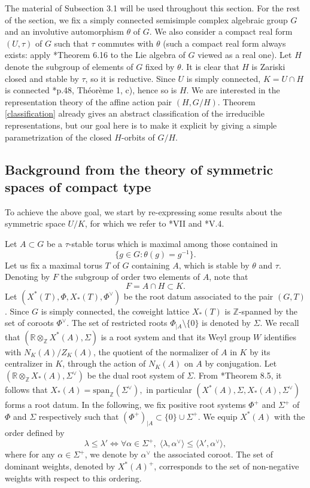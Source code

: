 \documentclass{amsart}
\theoremstyle{definition}
\begin{document}
The material of Subsection 3.1 will be used throughout this section. For the rest of the section, we fix a simply connected semisimple complex algebraic group $G$ and an involutive automorphism $\theta$ of $G$. We also consider a compact real form $(U,\tau)$ of $G$ such that $\tau$ commutes with $\theta$ (such a compact real form always exists: apply \cite{Knapp}*{Theorem 6.16} to the Lie algebra of $G$ viewed as a real one). Let $H$ denote the subgroup of elements of $G$ fixed by $\theta$. It is clear that $H$ is Zariski closed and stable by $\tau$, so it is reductive. Since $U$ is simply connected, $K = U\cap H$ is connected \cite{Bourbaki}*{p.48, Théorème 1, c)}, hence so is $H$. We are interested in the representation theory of the affine action pair $(H, G/H)$. Theorem \ref{classification} already gives an abstract classification of the irreducible representations, but our goal here is to make it explicit by giving a simple parametrization of the closed $H$-orbits of $G/H$.

\subsection{Background from the theory of symmetric spaces of compact type} To achieve the above goal, we start by re-expressing some results about the symmetric space $U/K$, for which we refer to \cite{Helgason1}*{VII} and \cite{Helgason2}*{V.4}.

Let $A \subset G$ be a $\tau$-stable torus which is maximal among those  contained in
$$\{ g \in G : \theta(g) = g^{-1}\}.$$ Let us fix a maximal torus $T$ of $G$ containing $A$, which is stable by $\theta$ and $\tau$. Denoting by $F$ the subgroup of order two elements of $A$, note that $$F = A \cap H \subset K.$$ Let $(X^*(T), \Phi, X_*(T), \Phi^\vee)$ be the root datum associated to the pair $(G,T)$. Since $G$ is simply connected, the coweight lattice $X_*(T)$ is $\mathbb{Z}$-spanned by the set of coroots $\Phi^\vee$. The set of restricted roots $\Phi_{|A} \setminus \{0\}$ is denoted by $\Sigma$. We recall that $(\mathbb{R}\otimes_\mathbb{Z} X^*(A), \Sigma)$ is a root system and that its Weyl group $W$ identifies with $N_K(A)/Z_K(A)$, the quotient of the normalizer of $A$ in $K$ by its centralizer in $K$, through the action of $N_K(A)$ on $A$ by conjugation. Let $(\mathbb{R}\otimes_\mathbb{Z}X_*(A), \Sigma^\vee)$ be the dual root system of $\Sigma$. From \cite{Helgason1}*{Theorem 8.5}, it follows that
$X_*(A) = \mathrm{span}_\mathbb{Z} (\Sigma^\vee),$
in particular $(X^*(A), \Sigma, X_*(A), \Sigma^\vee)$ forms a root datum. In the following, we fix positive root systems $\Phi^+$ and $\Sigma^+$ of $\Phi$ and $\Sigma$ respectively such that $(\Phi^+)_{|A} \subset \{0\} \cup \Sigma^+$. We equip $X^*(A)$ with the order defined by
$$\lambda \leq \lambda' \Longleftrightarrow \forall\alpha \in \Sigma^+,\; \langle \lambda, \alpha^\vee\rangle \leq \langle \lambda', \alpha^\vee\rangle,$$
where for any $\alpha \in \Sigma^+$, we denote by $\alpha^\vee$ the associated coroot. The set of dominant weights, denoted by $X^*(A)^+$, corresponds to the set of non-negative weights with respect to this ordering.
    
\end{document}
